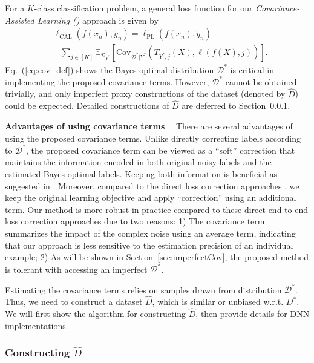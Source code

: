 \documentclass[final]{cvpr}
\newcommand{\estD}{{\hat D}}
\newcommand{\covpeer}{\text{CAL}}
\begin{document}
For a $K$-class classification problem, a general loss function for our \textit{Covariance-Assisted Learning (\covpeer{})} approach is given by
\begin{equation}\label{eq:cov_def}
    \begin{split}
       & \ell_{\covpeer} (f(x_n),\tilde y_n) =  {\ell_{\text{PL}}} (f(x_n),\tilde y_n)\\
&- \sum_{j\in[K]}  \mathbb E_{\mathcal D_{Y^*}} \left[\text{Cov}_{\mathcal D^*|Y^*} \left(T_{Y^*,j}(X), \ell(f(X), j)\right)\right].
    \end{split}
\end{equation}
Eq.~(\ref{eq:cov_def}) shows the Bayes optimal distribution $\mathcal D^*$ is critical in implementing the proposed covariance terms.
However, $\mathcal D^*$ cannot be obtained trivially, and only imperfect proxy constructions of the dataset (denoted by $\estD$) could be expected.
Detailed constructions of $\estD$ are deferred to Section~\ref{sec:alg}. 


\noindent\textbf{Advantages of using covariance terms}~~
There are several advantages of using the proposed covariance terms.
Unlike directly correcting labels according to $\mathcal D^*$, the proposed covariance term can be viewed as a ``soft'' correction that maintains the information encoded in both original noisy labels and the estimated Bayes optimal labels.
Keeping both information is beneficial as suggested in \cite{han2019deep}.
Moreover, compared to the direct loss correction approaches \cite{Patrini_2017_CVPR,xia2020parts,xia2019anchor}, we keep the original learning objective and apply ``correction'' using an additional term.
Our method is more robust in practice compared to these direct end-to-end loss correction approaches due to two reasons: 
1) The covariance term summarizes the impact of the complex noise using an average term, indicating that our approach is less sensitive to the estimation precision of an individual example; 2) As will be shown in Section~\ref{sec:imperfectCov}, the proposed method is tolerant with accessing an imperfect $\mathcal D^*$.





Estimating the covariance terms relies on samples drawn from distribution $\mathcal D^*$.
Thus, we need to construct a dataset $\estD$, which is similar or unbiased w.r.t. $D^*$.
We will first show the algorithm for constructing $\estD$, then provide details for DNN implementations.

\subsubsection{Constructing $\estD$}\label{sec:alg}
\end{document}
